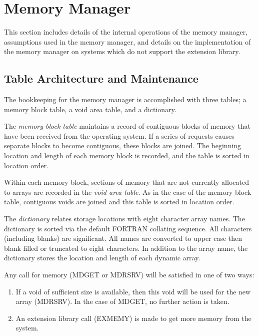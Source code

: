 \section{Memory Manager} \label{sec:table}
This section includes details of the internal operations of the memory
manager, assumptions used in the memory manager, and details on the
implementation of the memory manager on systems which do not support the
extension library.


\subsection{Table Architecture and Maintenance}
The bookkeeping for the memory manager is accomplished with three tables; a
memory block table, a void area table, and a dictionary.

The {\em
memory block table} maintains a record of contiguous blocks of memory
that have been received from the operating system.  If a series of requests
causes separate blocks to become contiguous, these blocks are joined.  The
beginning location and length of each memory block is recorded, and the
table is sorted in location order.

Within each memory block, sections of memory that are not currently
allocated to arrays are recorded in the {\em void area table}.  As in the
case of the memory block table, contiguous voids are joined and this table
is sorted in location order.

The {\em dictionary} relates storage locations with eight character array
names. The dictionary is sorted via the default FORTRAN collating sequence.
All characters (including blanks) are significant.
All names are converted to upper case then
blank filled or truncated to eight characters.
In addition to the array name, the
dictionary stores the location and length of each dynamic array.

Any call for memory (MDGET or MDRSRV) will be satisfied in one of two ways:
\begin{enumerate}
\item If a void of sufficient size is available, then this void will be
          used for the new array (MDRSRV).  In the case of MDGET, no further
          action is taken.

\item An extension library call (EXMEMY) is made to get more memory from
          the system.
\end{enumerate}

